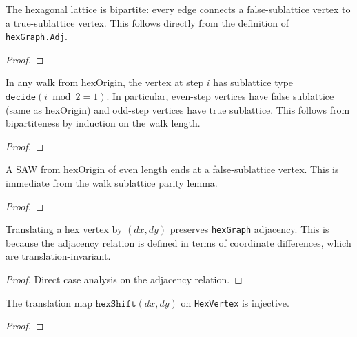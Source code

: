 \begin{lemma}\label{lem:hex_bipartite}
\leanok
{}
  The hexagonal lattice is bipartite: every edge connects a
  false-sublattice vertex to a true-sublattice vertex.
  This follows directly from the definition of \texttt{hexGraph.Adj}.
\end{lemma}
\begin{proof}
\leanok
\end{proof}

\begin{lemma}\label{lem:walk_parity}
\leanok
{}
  In any walk from hexOrigin, the vertex at step $i$ has sublattice
  type $\texttt{decide}(i \bmod 2 = 1)$. In particular, even-step
  vertices have false sublattice (same as hexOrigin) and odd-step
  vertices have true sublattice. This follows from bipartiteness
  by induction on the walk length.
\end{lemma}
\begin{proof}
\leanok
{}
\end{proof}

\begin{lemma}\label{lem:saw_even_false}
\leanok
{}
  A SAW from hexOrigin of even length ends at a false-sublattice vertex.
  This is immediate from the walk sublattice parity lemma.
\end{lemma}
\begin{proof}
\leanok
{}
\end{proof}

\begin{lemma}\label{lem:hex_shift_adj}
\leanok
{}
  Translating a hex vertex by $(dx, dy)$ preserves \texttt{hexGraph} adjacency.
  This is because the adjacency relation is defined in terms of coordinate
  differences, which are translation-invariant.
\end{lemma}
\begin{proof}
\leanok
  Direct case analysis on the adjacency relation.
\end{proof}

\begin{lemma}\label{lem:hex_shift_inj}
\leanok
{}
  The translation map $\texttt{hexShift}(dx, dy)$ on \texttt{HexVertex}
  is injective.
\end{lemma}
\begin{proof}
\leanok
\end{proof}

